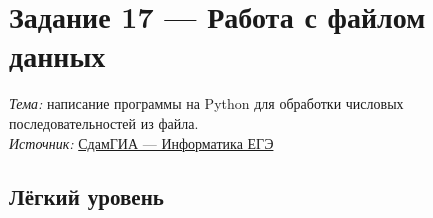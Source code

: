 \documentclass[a4paper]{article}
\begin{document}
\Large
\section*{Задание 17 — Работа с файлом данных}

\normalsize
\textit{Тема:} написание программы на Python для обработки числовых последовательностей из файла.\\
\textit{Источник:} \href{https://inf-ege.sdamgia.ru/}{СдамГИА — Информатика ЕГЭ}

\bigskip


\subsection*{\textcolor{easycolor}{Лёгкий уровень}}
\end{document}

